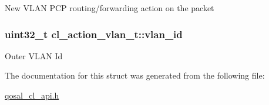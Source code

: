 New V\-L\-A\-N P\-C\-P routing/forwarding action on the packet \hypertarget{structcl__action__vlan__t_a04b2911e9e7e2f2b16d8488f924f441a}{
\subsubsection[{vlan\-\_\-id}]{\setlength{\rightskip}{0pt plus 5cm}uint32\-\_\-t cl\-\_\-action\-\_\-vlan\-\_\-t\-::vlan\-\_\-id}}\label{structcl__action__vlan__t_a04b2911e9e7e2f2b16d8488f924f441a}
Outer V\-L\-A\-N Id 

The documentation for this struct was generated from the following file\-:\begin{DoxyCompactItemize}
\item 
\hyperlink{qosal__cl__api_8h}{qosal\-\_\-cl\-\_\-api.\-h}\end{DoxyCompactItemize}
